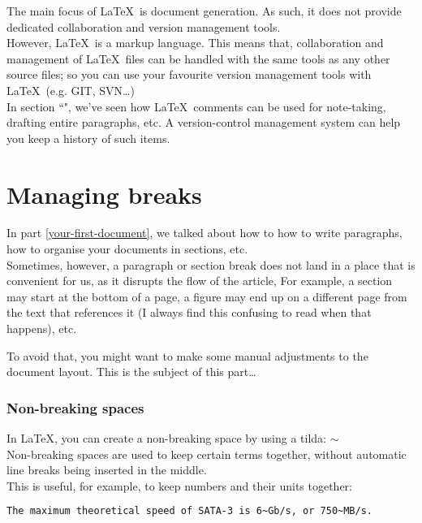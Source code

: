 The main focus of \LaTeX\ is document generation. As such, it does not provide dedicated collaboration and version management tools. \\

However, \LaTeX\ is a markup language. This means that, collaboration and management of \LaTeX\ files can be handled with the same tools as any other source files; so you can use your favourite version management tools with \LaTeX\ (e.g. GIT, SVN\dots) \\

In section ``", we've seen how \LaTeX\ comments can be used for note-taking, drafting entire paragraphs, etc. A version-control management system can help you keep a history of such items.


\newpage

\part{Managing breaks}

In part \ref{your-first-document}, we talked about how to how to write paragraphs, how to organise your documents in sections, etc. \\

Sometimes, however, a paragraph or section break does not land in a place that is convenient for us, as it disrupts the flow of the article, For example, a section may start at the bottom of a page, a figure may end up on a different page from the text that references it (I always find this confusing to read when that happens), etc. 

To avoid that, you might want to make some manual adjustments to the document layout. This is the subject of this part\dots

\section{Non-breaking spaces}

In \LaTeX, you can create a non-breaking space by using a tilda: $\sim$ \\

Non-breaking spaces are used to keep certain terms together, without automatic line breaks being inserted in the middle. \\

This is useful, for example, to keep numbers and their units together:

\begin{lstlisting}[language=tex]
	The maximum theoretical speed of SATA-3 is 6~Gb/s, or 750~MB/s.
\end{lstlisting}

